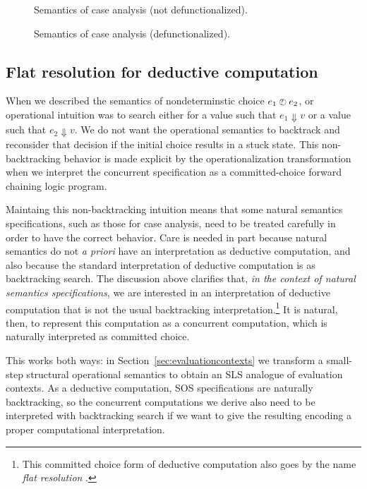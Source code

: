 \begin{figure}
\caption{Semantics of case analysis (not defunctionalized).}
\label{fig:ssos-minml-case-good}
\bigskip
{}
\caption{Semantics of case analysis (defunctionalized).}
\label{fig:ssos-minml-case-good-defun}
\end{figure}


\subsection{Flat resolution for deductive computation}

When we described the semantics of nondeterminstic choice $e_1 \mathbin{\mbox{$\ocircle$\hspace{-7pt}{\footnotesize ?}\hspace{3pt}}}
e_2$, or operational intuition was to search either for a value such
that $e_1 \Downarrow v$ or a value such that $e_2 \Downarrow v$. We do
not want the operational semantics to backtrack and reconsider that
decision if the initial choice results in a stuck state. This
non-backtracking behavior is made explicit by the operationalization
transformation when we interpret the concurrent specification as a
committed-choice forward chaining logic program.

Maintaing this non-backtracking intuition means that some natural
semantics specifications, such as those for case analysis, need to be
treated carefully in order to have the correct behavior. Care is
needed in part because natural semantics do not {\it a priori} have an
interpretation as deductive computation, and also because the standard
interpretation of deductive computation is as backtracking search.
The discussion above clarifies that, {\it in the context of natural
  semantics specifications}, we are interested in an interpretation of
deductive computation that is not the usual backtracking
interpretation.\footnote{This committed choice form of deductive
  computation also goes by the name {\it flat resolution}
  \cite{aitkaci99warrens}.} It is natural, then, to represent this
computation as a concurrent computation, which is naturally
interpreted as committed choice.

This works both ways: in Section~\ref{sec:evaluationcontexts}
we transform a small-step structural operational semantics to obtain
an SLS analogue of evaluation contexts. As a deductive computation,
SOS specifications are naturally backtracking, so the concurrent
computations we derive also need to be interpreted with backtracking
search if we want to give the resulting encoding a proper computational
interpretation.


